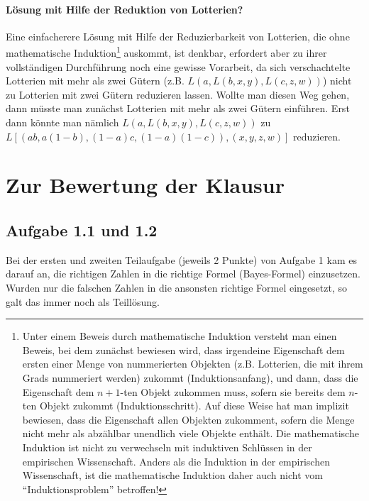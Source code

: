 \documentclass[10pt, a4paper, german]{article}
\numberwithin {equation}{section}
\begin{document}
\paragraph{Lösung mit Hilfe der Reduktion von Lotterien?\\}

Eine einfacherere Lösung mit Hilfe der Reduzierbarkeit von Lotterien,
die ohne mathematische Induktion\footnote{Unter einem Beweis durch
  mathematische Induktion versteht man einen Beweis, bei dem zunächst
  bewiesen wird, dass irgendeine Eigenschaft dem ersten einer Menge
  von nummerierten Objekten (z.B. Lotterien, die mit ihrem Grads
  nummeriert werden) zukommt (Induktionsanfang), und dann, dass die
  Eigenschaft dem $n+1$-ten Objekt zukommen muss, sofern sie bereits
  dem $n$-ten Objekt zukommt (Induktionsschritt). Auf diese Weise hat
  man implizit bewiesen, dass die Eigenschaft allen Objekten
  zukomment, sofern die Menge nicht mehr als abzählbar unendlich viele
  Objekte enthält. Die mathematische Induktion ist nicht zu
  verwechseln mit induktiven Schlüssen in der empirischen
  Wissenschaft. Anders als die Induktion in der empirischen
  Wissenschaft, ist die mathematische Induktion daher auch nicht vom
  ``Induktionsproblem'' betroffen!}  auskommt, ist denkbar, erfordert
aber zu ihrer vollständigen Durchführung noch eine gewisse Vorarbeit,
da sich verschachtelte Lotterien mit mehr als zwei Gütern
(z.B. $L(a,L(b,x,y),L(c,z,w))$) nicht zu Lotterien mit zwei
Gütern reduzieren lassen. Wollte man diesen Weg gehen, dann müsste
man zunächst Lotterien mit mehr als zwei Gütern einführen. Erst dann
könnte man nämlich $L(a,L(b,x,y),L(c,z,w))$ zu
$L[(ab,a(1-b),(1-a)c,(1-a)(1-c)), (x,y,z,w)]$ reduzieren.



\newpage 

\section{Zur Bewertung der Klausur}

\subsection{Aufgabe 1.1 und 1.2}

Bei der ersten und zweiten Teilaufgabe (jeweils 2 Punkte) von Aufgabe 1 kam es
darauf an, die richtigen Zahlen in die richtige Formel (Bayes-Formel) einzusetzen. Wurden
nur die falschen Zahlen in die ansonsten richtige Formel eingesetzt, so galt das
immer noch als Teillösung.
\end{document}
